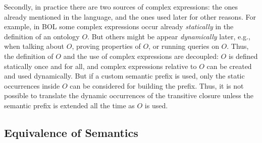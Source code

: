 Secondly, in practice there are two sources of complex expressions: the ones already mentioned in the language, and the ones used later for other reasons.
For example, in BOL some complex expressions occur already \emph{statically} in the definition of an ontology $O$.
But others might be appear \emph{dynamically} later, e.g., when talking about $O$, proving properties of $O$, or running queries on $O$.
Thus, the definition of $O$ and the use of complex expressions are decoupled: $O$ is defined statically once and for all, and complex expressions relative to $O$ can be created and used dynamically.
But if a custom semantic prefix is used, only the static occurrences inside $O$ can be considered for building the prefix.
Thus, it is not possible to translate the dynamic occurrences of the transitive closure unless the semantic prefix is extended all the time as $O$ is used.

\subsection{Equivalence of Semantics}

